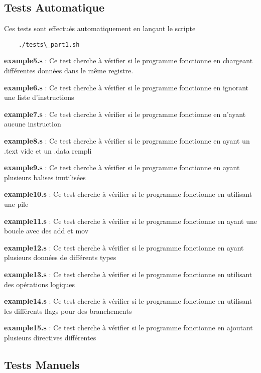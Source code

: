 \documentclass[a4paper]{article} %
\begin{document}
\subsection{Tests Automatique}

\noindent Ces tests sont effectués automatiquement en lançant le scripte 
\begin{lstlisting}
    ./tests\_part1.sh
\end{lstlisting}

\noindent \textbf{example5.s} :
Ce test cherche à vérifier si le programme fonctionne en chargeant différentes 
données dans le même registre. 
\bigbreak

\noindent \textbf{example6.s} :
Ce test cherche à vérifier si le programme fonctionne en ignorant une liste 
d’instructions
\bigbreak

\noindent \textbf{example7.s} :
Ce test cherche à vérifier si le programme fonctionne en n’ayant aucune 
instruction
\bigbreak

\noindent \textbf{example8.s} : 
Ce test cherche à vérifier si le programme fonctionne en ayant un .text vide et 
un .data rempli
\bigbreak

\noindent \textbf{example9.s} :
Ce test cherche à vérifier si le programme fonctionne en ayant plusieurs balises 
inutilisées
\bigbreak

\noindent \textbf{example10.s} :
Ce test cherche à vérifier si le programme fonctionne en utilisant une pile
\bigbreak

\noindent \textbf{example11.s} :
Ce test cherche à vérifier si le programme fonctionne en ayant une boucle avec des 
add et mov
\bigbreak

\noindent \textbf{example12.s} :
Ce test cherche à vérifier si le programme fonctionne en ayant plusieurs données de 
différents types
\bigbreak

\noindent \textbf{example13.s} :
Ce test cherche à vérifier si le programme fonctionne en utilisant des opérations 
logiques
\bigbreak

\noindent \textbf{example14.s} :
Ce test cherche à vérifier si le programme fonctionne en utilisant les différents 
flags pour des branchements
\bigbreak

\noindent \textbf{example15.s} :
Ce test cherche à vérifier si le programme fonctionne en ajoutant plusieurs 
directives différentes
\bigbreak

\subsection{Tests Manuels}
 
\end{document}
